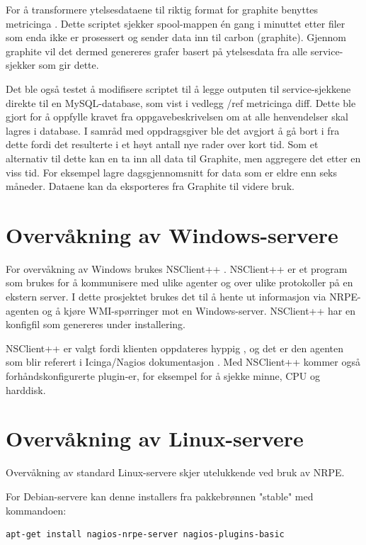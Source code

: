 For å transformere ytelsesdataene til riktig format for graphite benyttes metricinga \cite{metricinga}. Dette scriptet sjekker spool-mappen én gang i minuttet etter filer som enda ikke er prosessert og sender data inn til carbon (graphite). 
Gjennom graphite vil det dermed genereres grafer basert på ytelsesdata fra alle service-sjekker som gir dette.

Det ble også testet å modifisere scriptet til å legge outputen til service-sjekkene direkte til en MySQL-database, som vist i vedlegg /ref metricinga diff. Dette ble gjort for å oppfylle kravet fra oppgavebeskrivelsen om at alle henvendelser skal lagres i database. I samråd med oppdragsgiver ble det avgjort å gå bort i fra dette fordi det resulterte i et høyt antall nye rader over kort tid. Som et alternativ til dette kan en ta inn all data til Graphite, men aggregere det etter en viss tid. For eksempel lagre dagsgjennomsnitt for data som er eldre enn seks måneder. Dataene kan da eksporteres fra Graphite til videre bruk.

\section{Overvåkning av Windows-servere}
For overvåkning av Windows brukes NSClient++ \cite{nsclientmain}. NSClient++ er et program som brukes for å kommunisere med ulike agenter og over ulike protokoller på en ekstern server. I dette prosjektet brukes det til å hente ut informasjon via NRPE-agenten og å kjøre WMI-spørringer mot en Windows-server. NSClient++ har en konfigfil som genereres under installering. 

NSClient++ er valgt fordi klienten oppdateres hyppig \cite{nsclient}, og det er den agenten som blir referert i Icinga/Nagios dokumentasjon \cite{icingawin}. Med NSClient++ kommer også forhåndskonfigurerte plugin-er, for eksempel for å sjekke minne, CPU og harddisk.

\section{Overvåkning av Linux-servere}\label{sec:overvaklinux}
Overvåkning av standard Linux-servere skjer utelukkende ved bruk av NRPE. 

For Debian-servere kan denne installers fra pakkebrønnen "stable" med kommandoen:

\begin{lstlisting}
apt-get install nagios-nrpe-server nagios-plugins-basic
\end{lstlisting}

